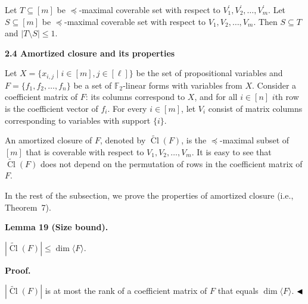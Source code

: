 Let $T\subseteq[m]$ be $\preceq$-maximal coverable set with respect to $V^{\prime}_{1},V^{\prime}_{2},\dots,V^{\prime}_{m}$. Let $S\subseteq[m]$ be $\preceq$-maximal coverable set with respect to $V_{1},V_{2},\dots,V_{m}$. Then $S\subseteq T$ and $|T\setminus S|\leq 1$.\par



\par\medskip\noindent\textbf{
2.4 Amortized closure and its properties}\par


Let $X=\{x_{i,j}\mid i\in[m],j\in[\ell]\}$ be the set of propositional variables and
$F=\{f_{1},f_{2},\dots,f_{n}\}$ be a set of $\mathbb{F}_{2}$-linear forms with variables from $X$. Consider a coefficient matrix of $F$: its columns correspond to $X$, and for all $i\in[n]$ $i$th row is the coefficient vector of $f_{i}$. For every $i\in[m]$, let $V_{i}$ consist of matrix columns corresponding to variables with support $\{i\}$.\par



An amortized closure of $F$, denoted by $\widetilde{\mathop{\mathrm{Cl}}}(F)$, is the $\preceq$-maximal subset of $[m]$ that is coverable with respect to $V_{1},V_{2},\dots,V_{m}$.
It is easy to see that $\widetilde{\mathop{\mathrm{Cl}}}(F)$ does not depend on the permutation of rows in the coefficient matrix of $F$.\par



In the rest of the subsection, we prove the properties of amortized closure (i.e., Theorem 7).\par



\par\medskip\noindent\textbf{
Lemma 19 (Size bound).
}\par



$|\widetilde{\mathop{\mathrm{Cl}}}(F)|\leq\dim\langle F\rangle$.\par



\par\medskip\noindent\textbf{Proof.}\par


$|\widetilde{\mathop{\mathrm{Cl}}}(F)|$ is at most the rank of a coefficient matrix of $F$ that equals $\dim\langle F\rangle$.
$\hfill\blacktriangleleft$\par



